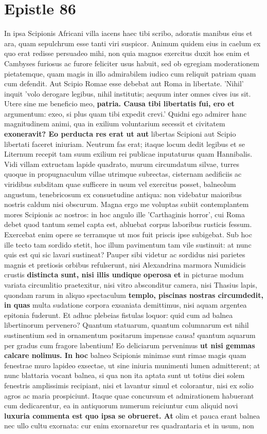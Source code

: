 \section{Epistle 86}
In ipsa Scipionis Africani villa iacens haec tibi scribo, adoratis manibus eius et ara, quam sepulchrum esse tanti viri suspicor. Animum quidem eius in caelum ex quo erat redisse persuadeo mihi, non quia magnos exercitus duxit hos enim et Cambyses furiosus ac furore feliciter usus habuit, sed ob egregiam moderationem pietatemque, quam magis in illo admirabilem iudico cum reliquit patriam quam cum defendit. Aut Scipio Romae esse debebat aut Roma in libertate. 'Nihil' inquit 'volo derogare legibus, nihil institutis; aequum inter omnes cives ius sit. Utere sine me beneficio meo, \textbf{patria. Causa tibi libertatis fui, ero et} argumentum: exeo, si plus quam tibi expedit crevi.' Quidni ego admirer hanc magnitudinem animi, qua in exilium voluntarium secessit et civitatem \textbf{exoneravit? Eo perducta res erat ut aut} libertas Scipioni aut Scipio libertati faceret iniuriam. Neutrum fas erat; itaque locum dedit legibus et se Liternum recepit tam suum exilium rei publicae inputaturus quam Hannibalis. Vidi villam extructam lapide quadrato, murum circumdatum silvae, turres quoque in propugnaculum villae utrimque subrectas, cisternam aedificiis ac viridibus subditam quae sufficere in usum vel exercitus posset, balneolum angustum, tenebricosum ex consuetudine antiqua: non videbatur maioribus nostris caldum nisi obscurum. Magna ergo me voluptas subiit contemplantem mores Scipionis ac nostros: in hoc angulo ille 'Carthaginis horror', cui Roma debet quod tantum semel capta est, abluebat corpus laboribus rusticis fessum. Exercebat enim opere se terramque ut mos fuit priscis ipse subigebat. Sub hoc ille tecto tam sordido stetit, hoc illum pavimentum tam vile sustinuit: at nunc quis est qui sic lavari sustineat? Pauper sibi videtur ac sordidus nisi parietes magnis et pretiosis orbibus refulserunt, nisi Alexandrina marmora Numidicis crustis \textbf{\textbf{distincta sunt, nisi illis undique operosa} et} in picturae modum variata circumlitio praetexitur, nisi vitro absconditur camera, nisi Thasius lapis, quondam rarum in aliquo spectaculum \textbf{templo, piscinas nostras circumdedit, in quas} multa sudatione corpora exsaniata demittimus, nisi aquam argentea epitonia fuderunt. Et adhuc plebeias fistulas loquor: quid cum ad balnea libertinorum pervenero? Quantum statuarum, quantum columnarum est nihil sustinentium sed in ornamentum positarum impensae causa! quantum aquarum per gradus cum fragore labentium! Eo deliciarum pervenimus \textbf{ut nisi gemmas calcare nolimus. In hoc} balneo Scipionis minimae sunt rimae magis quam fenestrae muro lapideo exsectae, ut sine iniuria munimenti lumen admitterent; at nunc blattaria vocant balnea, si qua non ita aptata sunt ut totius diei solem fenestris amplissimis recipiant, nisi et lavantur simul et colorantur, nisi ex solio agros ac maria prospiciunt. Itaque quae concursum et admirationem habuerant cum dedicarentur, ea in antiquorum numerum reiciuntur cum aliquid novi \textbf{luxuria commenta est quo ipsa se obrueret. At} olim et pauca erant balnea nec ullo cultu exornata: cur enim exornaretur res quadrantaria et in usum, non 